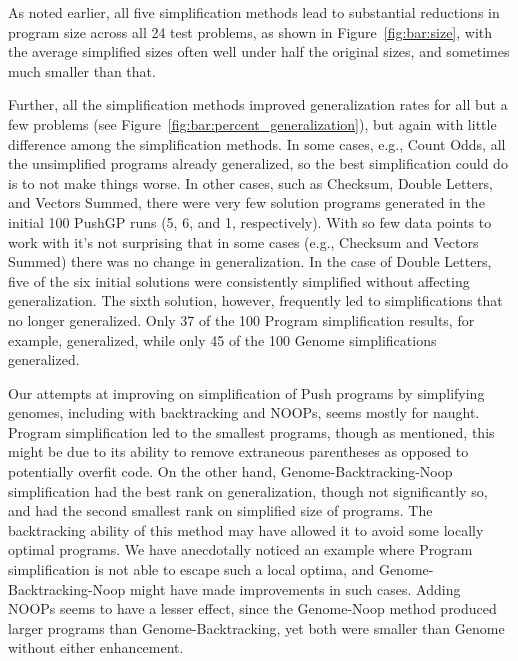 As noted earlier, all five simplification methods lead to substantial
reductions in program size across all 24 test problems, as shown in
Figure~\ref{fig:bar:size}, with the average simplified sizes often 
well under half the original sizes, and sometimes much smaller than that.

Further, all the simplification methods improved generalization rates for
all but a few problems (see Figure~\ref{fig:bar:percent_generalization}),
but again with little difference among the simplification methods.
In some cases, e.g., Count Odds, all the unsimplified programs already
generalized, so the best simplification could do is to not make things
worse. In other cases, such as
Checksum, Double Letters, and Vectors Summed, there were very few 
solution programs generated in the initial 100 PushGP runs (5, 6, and 1,
respectively). With so few data points to work with it's not surprising
that in some cases (e.g., Checksum and Vectors Summed) there was no change
in generalization. In the case of Double Letters, five of the six initial
solutions were consistently simplified without affecting generalization.
The sixth solution, however, frequently led to simplifications that no 
longer generalized. Only 37 of the 100 Program simplification results, 
for example, generalized, while only 45 of the 100 Genome simplifications
generalized.


Our attempts at improving on simplification of Push programs by simplifying genomes, including with backtracking and NOOPs, seems mostly for naught. Program simplification led to the smallest programs, though as mentioned, this might be due to its ability to remove extraneous parentheses as opposed to potentially overfit code. On the other hand, Genome-Backtracking-Noop simplification had the best rank on generalization, though not significantly so, and had the second smallest rank on simplified size of programs. The backtracking ability of this method may have allowed it to avoid some locally optimal programs. We have anecdotally noticed an example where Program simplification is not able to escape such a local optima, and Genome-Backtracking-Noop might have made improvements in such cases. Adding NOOPs seems to have a lesser effect, since the Genome-Noop method produced larger programs than Genome-Backtracking, yet both were smaller than Genome without either enhancement.

